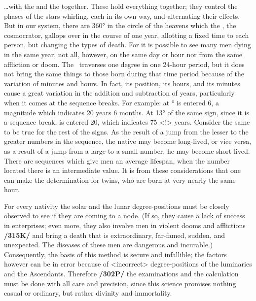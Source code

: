 …with the \Sun\xspace and the \Moon\xspace together. These hold everything together; they control the phases of the stars whirling, each in its own way, and alternating their effects. But in our system, there are 360° in the circle of the heavens which the \Sun, the cosmocrator, gallops over in the course of one year, allotting a fixed
time to each person, but changing the types of death. For it is possible to see many men dying in the same year, not all, however, on the same day or hour nor from the same affliction or doom. The \Sun\, traverses one degree in one 24-hour period, but it does not bring the same things to those born during that time period because of the variation of minutes and hours. In fact, its position, its hours, and its minutes cause a great variation in the addition and subtraction of years, particularly when it comes at the sequence breaks. For example: at \Leo\xspace 12° is entered 6, a magnitude which indicates 20 years 6 months. At 13° of the same sign, since it is a sequence break, is entered 20, which indicates 75 <!> years. Consider the same to be true for the rest of the signs. As the result of a jump from the lesser to the greater numbers in the sequence, the native may become long-lived, or vice versa, as a result of a jump from a large to a small number, he may become short-lived. There are sequences which give men an average lifespan, when the number located there is an intermediate value. It is from these considerations that one can make the determination for twins, who are born at very nearly the same hour.

For every nativity the solar and the lunar degree-positions must be closely observed to see if they are coming to a node. (If so, they cause a lack of success in enterprises; even more, they also involve men in violent dooms and afflictions \textbf{/315K/} and bring a death that is extraordinary, far-famed, sudden, and unexpected. The diseases of these men are dangerous and incurable.) Consequently, the basis of this method is secure and infallible; the factors however can be in error because of <incorrect> degree-positions of the luminaries and the Ascendants. Therefore \textbf{/302P/} the examinations and the calculation must be done with all care and precision, since this science promises nothing casual or ordinary, but rather divinity and immortality.

